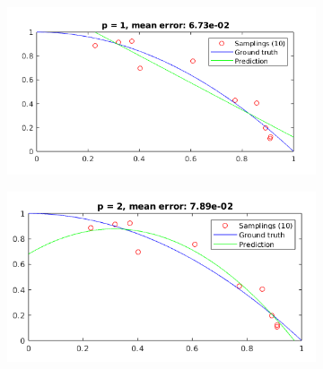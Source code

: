 \documentclass[12pt]{article}
\begin{document}
\begin{figure}[H]
  \centering
  \begin{subfigure}{0.45\textwidth}
    \includegraphics[width=\textwidth]{plots/regression/p_eq_1.png}
  \end{subfigure}
  \begin{subfigure}{0.45\textwidth}
    \includegraphics[width=\textwidth]{plots/regression/p_eq_2.png}
  \end{subfigure}
\end{figure}
\end{document}
